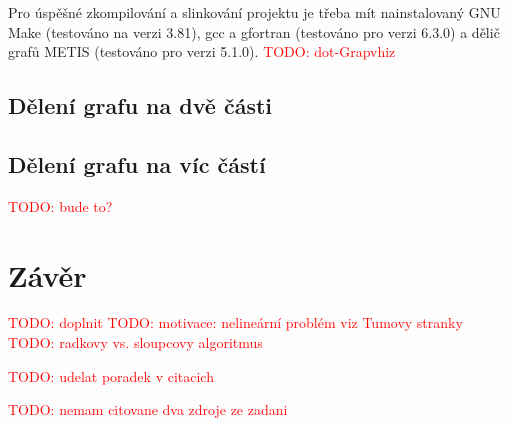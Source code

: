 \documentclass[11pt,american,czech,oneside]{book}
\theoremstyle{plain}
\theoremstyle{definition}
\newcommand{\TODO}[1]{\textcolor{red}{TODO: #1}}
\begin{document}
Pro úspěšné zkompilování a slinkování projektu je třeba mít nainstalovaný GNU Make (testováno na verzi 3.81), gcc a gfortran (testováno pro verzi 6.3.0) a dělič grafů METIS (testováno pro verzi 5.1.0). \TODO{dot-Grapvhiz}

\section{Dělení grafu na dvě části}
\section{Dělení grafu na víc částí}
\TODO{bude to?}


\chapter*{Závěr}
\TODO{doplnit}
\TODO{motivace: nelineární problém viz Tumovy stranky}
\TODO{radkovy vs. sloupcovy algoritmus}


\newpage



\TODO{udelat poradek v citacich}

\TODO{nemam citovane dva zdroje ze zadani}
\end{document}
